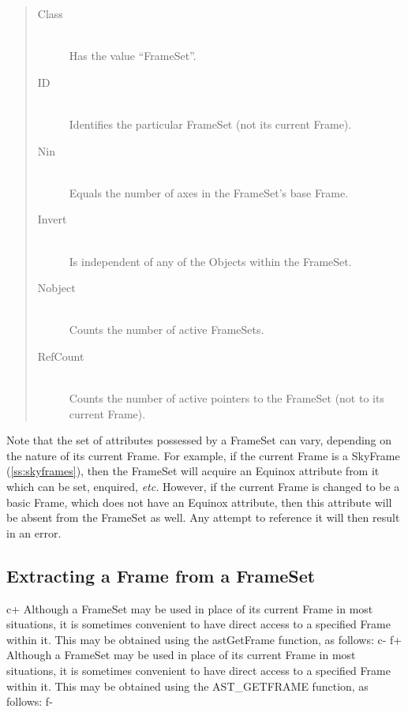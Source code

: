 \documentclass[twoside,11pt]{article}
\newcommand{\secref}[1]{\S\ref{#1}}
\renewcommand{\secref}[1]{\ref{#1}}
\begin{document}
\begin{quote}
\begin{description}
\item[Class]\mbox{}\\
Has the value ``FrameSet''.

\item[ID]\mbox{}\\
Identifies the particular FrameSet (not its current Frame).

\item[Nin]\mbox{}\\
Equals the number of axes in the FrameSet's base Frame.

\item[Invert]\mbox{}\\
Is independent of any of the Objects within the FrameSet.

\item[Nobject]\mbox{}\\
Counts the number of active FrameSets.

\item[RefCount]\mbox{}\\
Counts the number of active pointers to the FrameSet (not to its
current Frame).
\end{description}
\end{quote}

Note that the set of attributes possessed by a FrameSet can vary,
depending on the nature of its current Frame. For example, if the
current Frame is a SkyFrame (\secref{ss:skyframes}), then the FrameSet
will acquire an Equinox attribute from it which can be set, enquired,
{\em{etc.}}  However, if the current Frame is changed to be a basic
Frame, which does not have an Equinox attribute, then this attribute
will be absent from the FrameSet as well. Any attempt to reference it
will then result in an error.

\subsection{Extracting a Frame from a FrameSet}

c+
Although a FrameSet may be used in place of its current Frame in most
situations, it is sometimes convenient to have direct access to a
specified Frame within it. This may be obtained using the astGetFrame
function, as follows:
c-
f+
Although a FrameSet may be used in place of its current Frame in most
situations, it is sometimes convenient to have direct access to a
specified Frame within it. This may be obtained using the
AST\_GETFRAME function, as follows:
f-
\end{document}
